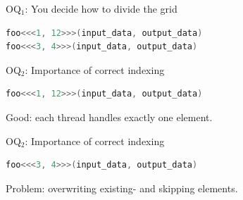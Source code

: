 \documentclass[11pt,t]{beamer}
\begin{document}
\begin{frame}[fragile]{OQ$_\text{1}$: You decide how to divide the grid} 

\begin{lstlisting}[language=C++]
foo<<<1, 12>>>(input_data, output_data)
foo<<<3, 4>>>(input_data, output_data)
\end{lstlisting}

\begin{figure}[t]
    \centering
    \begin{center}               
        \resizebox{0.8\columnwidth}{!}{}
    \end{center}
\end{figure}

\end{frame}



\begin{frame}[fragile]{OQ$_\text{2}$: Importance of correct indexing} 

\begin{lstlisting}[language=C++]
foo<<<1, 12>>>(input_data, output_data)
\end{lstlisting}

\vspace{-0 em}

\begin{figure}[t]
    \centering
    \begin{center}               
        \resizebox{0.8\columnwidth}{!}{}
    \end{center}
\end{figure}

Good: each thread handles exactly one element.

\end{frame}



\begin{frame}[fragile]{OQ$_\text{2}$: Importance of correct indexing} 

\begin{lstlisting}[language=C++]
foo<<<3, 4>>>(input_data, output_data)
\end{lstlisting}

\vspace{-1 em}

\begin{figure}[t]
    \centering
    \begin{center}               
        \resizebox{0.8\columnwidth}{!}{}
    \end{center}
\end{figure}

Problem: overwriting existing- and skipping elements.

\end{frame}
\end{document}
